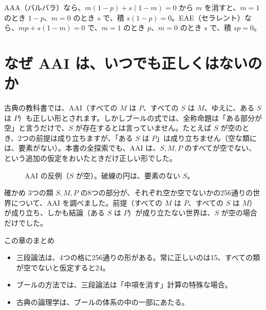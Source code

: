 \documentclass[a4paper,11pt,openany]{ltjsbook}
\begin{document}
AAA（バルバラ）なら、$m(1-p)+s(1-m)=0$ から $m$ を消すと、$m=1$ のとき $1-p$、$m=0$ のとき $s$ で、積 $s(1-p)=0$。EAE（セラレント）なら、$mp+s(1-m)=0$ で、$m=1$ のとき $p$、$m=0$ のとき $s$ で、積 $sp=0$。

\section{なぜ AAI は、いつでも正しくはないのか}

古典の教科書では、AAI（すべての $M$ は $P$、すべての $S$ は $M$、ゆえに、ある $S$ は $P$）も正しい形とされます。しかしブールの式では、全称命題は「ある部分が空」と言うだけで、$S$ が存在するとは言っていません。たとえば $S$ が空のとき、2つの前提は成り立ちますが、「ある $S$ は $P$」は成り立ちません（空な類には、要素がない）。本書の全探索でも、AAI は、$S,M,P$ のすべてが空でない、という追加の仮定をおいたときだけ正しい形でした。

\begin{figure}[htbp]
\centering
{}
\caption{AAI の反例（$S$ が空）。破線の円は、要素のない $S$。}
\end{figure}

\begin{examplebox}{確かめ}
3つの類 $S,M,P$ の8つの部分が、それぞれ空か空でないかの256通りの世界について、AAI を調べました。前提（すべての $M$ は $P$、すべての $S$ は $M$）が成り立ち、しかも結論（ある $S$ は $P$）が成り立たない世界は、$S$ が空の場合だけでした。
\end{examplebox}

\begin{pointbox}{この章のまとめ}
\begin{itemize}[leftmargin=*]
\item 三段論法は、4つの格に256通りの形がある。常に正しいのは15、すべての類が空でないと仮定すると24。
\item ブールの方法では、三段論法は「中項を消す」計算の特殊な場合。
\item 古典の論理学は、ブールの体系の中の一部にあたる。
\end{itemize}
\end{pointbox}
\end{document}
